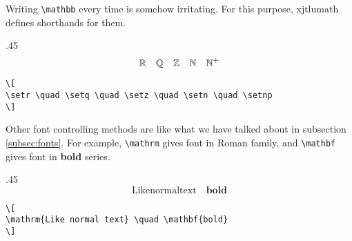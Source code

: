 Writing \verb=\mathbb= every time is somehow irritating. For this purpose, xjtlumath defines shorthands for them.
\begin{parexammar}{.45\textandmarginlen}{
\[
\mathbb{R} \quad \mathbb{Q} \quad \mathbb{Z} \quad \mathbb{N} \quad \mathbb{N}^+
\]
}
\begin{lstlisting}
\[
\setr \quad \setq \quad \setz \quad \setn \quad \setnp
\]
\end{lstlisting}
\end{parexammar}

Other font controlling methods are like what we have talked about in subsection \ref{subsec:fonts}. For example, \verb=\mathrm= gives font in \textrm{Roman} family, and \verb=\mathbf= gives font in \textbf{bold} series.
\begin{parexammar}{.45\textandmarginlen}{
\[
\mathrm{Like normal text} \quad \mathbf{bold}
\]
}
\begin{lstlisting}
\[
\mathrm{Like normal text} \quad \mathbf{bold}
\]
\end{lstlisting}
\end{parexammar}